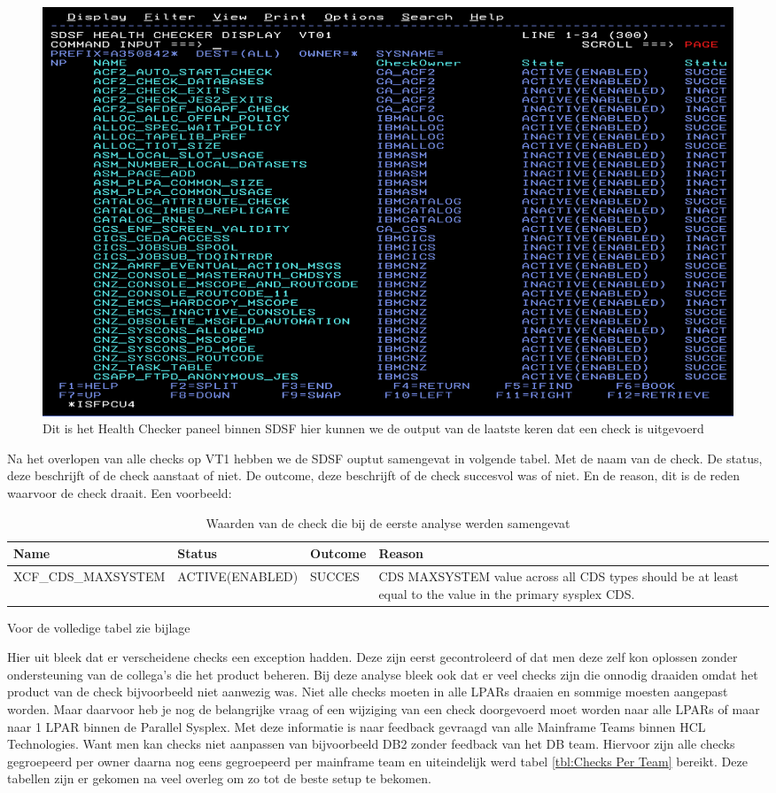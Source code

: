 \begin{figure}[h]
	\centering
	\includegraphics[width=0.7\linewidth]{img/SDSFCK}
	\caption[Health Checker Scherm binnen SDSF]{Dit is het Health Checker paneel binnen SDSF hier kunnen we de output van de laatste keren dat een check is uitgevoerd}
	\label{fig:sdsfck}
\end{figure}


Na het overlopen van alle checks op VT1 hebben we de SDSF ouptut samengevat in volgende tabel. Met de naam van de check. De status, deze beschrijft of de check aanstaat of niet. De outcome, deze beschrijft of de check succesvol was of niet. En de reason, dit is de reden waarvoor de check draait. Een voorbeeld:
\begin{table}[]
	\begin{tabular}{|p{5cm}|p{3.5cm}|p{1.5cm}|p{5cm}|}
		\hline
		\textbf{Name} & \textbf{Status} & \textbf{Outcome} & \textbf{Reason} \\
		\hline
		XCF\_CDS\_MAXSYSTEM & ACTIVE(ENABLED) & SUCCES & CDS MAXSYSTEM value across all CDS types should be at least equal to the value 
		in the primary sysplex CDS.  \\
		\hline
	\end{tabular}
	\caption[Individuele check]{Waarden van de check die bij de eerste analyse werden samengevat}
	\label{tbl:Individuele check}
\end{table}


Voor de volledige tabel zie bijlage 

Hier uit bleek dat er verscheidene checks een exception hadden. Deze zijn eerst gecontroleerd of dat men deze zelf kon oplossen zonder ondersteuning van de collega's die het product beheren. Bij deze analyse bleek ook dat er veel checks zijn die onnodig draaiden omdat het product van de check bijvoorbeeld niet aanwezig was. Niet alle checks moeten in alle LPARs draaien en sommige moesten aangepast worden. Maar daarvoor heb je nog de belangrijke vraag of een wijziging van een check doorgevoerd moet worden naar alle LPARs of maar naar 1 LPAR binnen de Parallel Sysplex. Met deze informatie is naar feedback gevraagd van alle Mainframe Teams binnen HCL Technologies. Want men kan checks niet aanpassen van bijvoorbeeld DB2 zonder feedback van het DB team. Hiervoor zijn alle checks gegroepeerd per owner daarna nog eens gegroepeerd per mainframe team en uiteindelijk werd tabel \ref{tbl:Checks Per Team} bereikt. Deze tabellen zijn er gekomen na veel overleg om zo tot de beste setup te bekomen.

